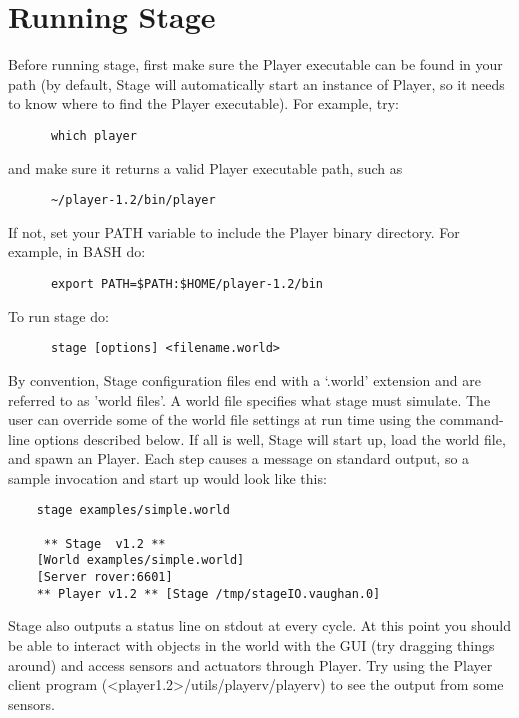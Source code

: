 \documentclass[11pt]{report}
\begin{document}
  \section{Running Stage}

    Before running stage, first make sure the Player executable can be
    found in your path (by default, Stage will automatically start an instance of Player, so it needs to know where to find the Player executable).
    For example, try:
      \begin{verbatim}
      which player
      \end{verbatim}
    and make sure it returns a valid Player executable path, such as
      \begin{verbatim}
      ~/player-1.2/bin/player
      \end{verbatim}
    If not, set your PATH variable to include the Player binary directory. 
    For example, in BASH do:
      \begin{verbatim}  
      export PATH=$PATH:$HOME/player-1.2/bin
      \end{verbatim}  

    To run stage do: 
      \begin{verbatim} 
      stage [options] <filename.world> 
      \end{verbatim} 

    By convention, Stage configuration files end with a `.world'
    extension and are referred to as 'world files'. A world file
    specifies what stage must simulate. The user can override some of
    the world file settings at run time using the command-line options
    described below. If all is well, Stage will start up, load the
    world file, and spawn an Player. Each step causes a message on
    standard output, so a sample invocation and start up would look
    like this:

	\begin{verbatim} 
	stage examples/simple.world

	 ** Stage  v1.2 ** 
	[World examples/simple.world]
	[Server rover:6601]
	** Player v1.2 ** [Stage /tmp/stageIO.vaughan.0]
      \end{verbatim}

    Stage also outputs a status line on stdout at every cycle.  At
    this point you should be able to interact with objects in the
    world with the GUI (try dragging things around) and access sensors
    and actuators through Player. Try using the Player client program
    (<player1.2>/utils/playerv/playerv) to see the output from some
    sensors.
\end{document}
